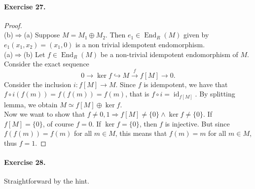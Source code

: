 \documentclass[12pt,a4paper]{report}
\theoremstyle{definition}
\theoremstyle{num.custom-title}
\DeclareMathOperator{\id}{id}
\DeclareMathOperator{\End}{End}
\DeclareMathOperator{\imp}{\Rightarrow}
\begin{document}
\paragraph{Exercise 27.} 
\begin{proof}\ \\
(b)$\imp$(a) Suppose $M=M_1 \oplus M_2$. Then $e_1 \in \End_R(M)$ given by $e_1(x_1,x_2)=(x_1,0)$ is a non trivial idempotent endomorphism.\\
(a)$\imp$(b) Let $f \in \End_R(M)$ be a non-trivial idempotent endomorphism of $M$. Consider the exact sequence
\[
0 \to \ker f \hookrightarrow M \stackrel{f}{\to} f[M] \to 0.
\]
Consider the inclusion $i : f[M] \to M$. Since $f$ is idempotent, we have that $f \circ i (f(m)) = f(f(m)) = f(m)$, that is $f \circ i = \id_{f[M]}$. By splitting lemma, we obtain $M \simeq f[M] \oplus \ker f$.\\
Now we want to show that $f \neq 0,1 \imp f[M] \neq \{0\} \wedge \ker f \neq \{0\}$. If $f[M]=\{0\}$, of course $f=0$. If $\ker f = \{0\}$, then $f$ is injective. But since $f(f(m))=f(m)$ for all $m \in M$, this means that $f(m)=m$ for all $m \in M$, thus $f=1$.
\end{proof}

\paragraph{Exercise 28.} Straightforward by the hint.
\end{document}
